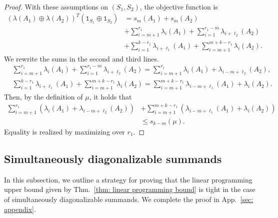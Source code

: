 \documentclass[12pt]{article}
\theoremstyle{definition}
\numberwithin{equation}{section}
\numberwithin{equation}{section}
\newcommand{\la}{\lambda}
\newcommand{\one}{\mathtt{1}}
\begin{document}
\begin{proof}
With these assumptions on \((S_1, S_2)\), the objective function is
\begin{equation}
\begin{aligned}
    (\la (A_1) \oplus \la(A_2))^T (\one_{S_1} \oplus \one_{S_2}) &= s_{m} (A_1) + s_{m} (A_2) \\
    &+\sum_{i=m+1}^{r_1} \la_i(A_1) +  \sum_{i=1}^{r_1-m} \la_{i+\ell_2}(A_2) \\
    &+  \sum_{i=1}^{k-r_1} \la_{i+\ell_1}(A_1) + \sum_{i=m+1}^{m+k-r_1} \la_i (A_2).
\end{aligned}
\end{equation}
We rewrite the sums in the second and third lines.
\begin{equation}
\begin{aligned}
   &\sum_{i=m+1}^{r_1} \la_i(A_1) +  \sum_{i=1}^{r_1-m} \la_{i+\ell_2}(A_2) = \sum_{i=m+1}^{r_1} \la_i(A_1) +  \la_{i-m+\ell_2}(A_2), \\
   &\sum_{i=1}^{k-r_1} \la_{i+\ell_1}(A_1) + \sum_{i= m+1}^{m+k-r_1} \la_i (A_2)  =  \sum_{i= m+1}^{m+k-r_1}  \la_{i-m+\ell_1}(A_1) + \la_i (A_2) .
\end{aligned}
\end{equation}
Then, by the definition of \(\mu\), it holds that 
\begin{equation}
\begin{aligned}
\sum_{i=m+1}^{r_1} (\la_i(A_1) +  \la_{i-m+\ell_2}(A_2)) &+ \sum_{i= m+1}^{m+k-r_1}  (\la_{i-m+\ell_1}(A_1) + \la_i (A_2))\\
&\leq s_{k-m} (\mu).
\end{aligned}
\end{equation}
Equality is realized by maximizing over \(r_1\). \end{proof}



\subsection{Simultaneously diagonalizable summands}
\label{subsec: tightness}
In this subsection,  we outline a strategy for proving that the linear programming upper bound given by Thm.~\ref{thm: linear programming bound} is tight in the case of simultaneously diagonalizable summands. We complete the proof in App.~\ref{sec: appendix}.
\end{document}
